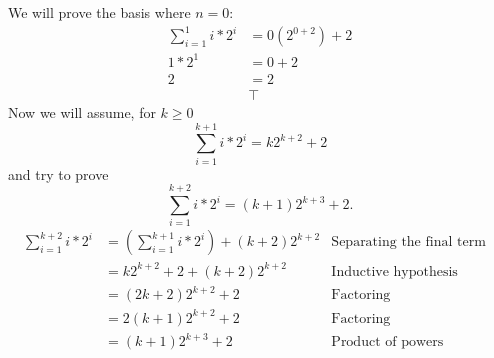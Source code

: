 \documentclass{article}
\begin{document}
\section{}
We will prove the basis where $n=0$:
\begin{align*}
    \sum_{i=1}^{1}  i*2^i &= 0(2^{0+2}) +2 \\
    1*2^1 &= 0+2 \\
    2 &=2 \\
    &\top
\end{align*}
Now we will assume, for $k \geq 0$
\begin{equation*}
    \sum_{i=1}^{k+1} i*2^i = k2^{k+2}+2
\end{equation*}
and try to prove
\begin{equation*}
    \sum_{i=1}^{k+2} i*2^i = (k+1)2^{k+3}+2.
\end{equation*}
\begin{align*}
    \sum_{i=1}^{k+2} i*2^i &= (\sum_{i=1}^{k+1} i*2^i ) + (k+2)2^{k+2} &\text{Separating the final term}&\\
    &= k2^{k+2}+2 + (k+2)2^{k+2} &\text{Inductive hypothesis}&\\
    &= (2k+2)2^{k+2} +2 &\text{Factoring}&\\
    &= 2(k+1)2^{k+2} +2 &\text{Factoring}&\\
    &= (k+1)2^{k+3} +2 &\text{Product of powers}&
\end{align*}
\rightline{$\blacksquare$}
\end{document}
